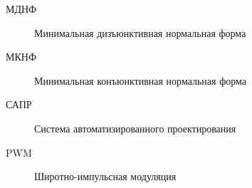 \Abbreviations %
\begin{description}
\item [МДНФ] Минимальная дизъюнктивная нормальная форма
\item [МКНФ] Минимальная конъюнктивная нормальная форма
\item [САПР] Система автоматизированного проектирования
\item [PWM]  Широтно-импульсная модуляция
\end{description}

